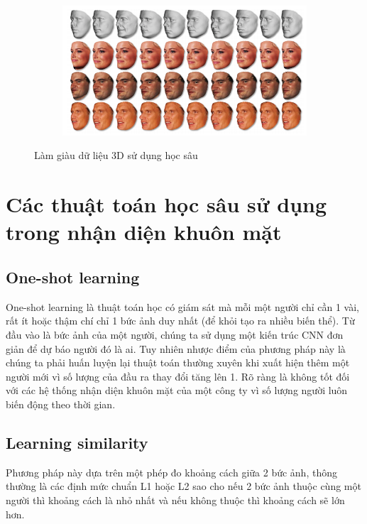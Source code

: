 \begin{figure}
    \begin{subfigure}{1.\textwidth}
        \begin{center}
            \includegraphics[width=1.\linewidth]{Chapters/items/chap3_6.jpg}
        \end{center}
        \label{fig: chap3_6}
    \end{subfigure}
    \caption{Làm giàu dữ liệu 3D sử dụng học sâu}
\end{figure}


\newpage
\section{Các thuật toán học sâu sử dụng trong nhận diện khuôn mặt}
\subsection{One-shot learning}

One-shot learning là thuật toán học có giám sát mà mỗi một người chỉ cần 1 vài,
rất ít hoặc thậm chí chỉ 1 bức ảnh duy nhất (để khỏi tạo ra nhiều biến thể).
Từ đầu vào là bức ảnh của một người, chúng ta sử dụng một kiến trúc CNN
đơn giản để dự báo người đó là ai.
Tuy nhiên nhược điểm của phương pháp này là chúng ta phải huấn luyện lại thuật
toán thường xuyên khi xuất hiện thêm một người mới vì số lượng của đầu ra thay đổi tăng lên 1.
Rõ ràng là không tốt đối với các hệ thống nhận diện khuôn mặt của một công ty vì số lượng người luôn biến động theo thời gian.

\subsection{Learning similarity}

Phương pháp này dựa trên một phép đo khoảng cách giữa 2 bức ảnh, thông thường là các định
mức chuẩn L1 hoặc L2 sao cho nếu 2 bức ảnh thuộc cùng một người thì khoảng cách là
nhỏ nhất và nếu không thuộc thì khoảng cách sẽ lớn hơn.

